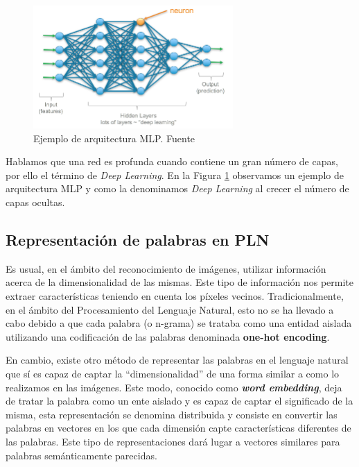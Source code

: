 \begin{figure}[!ht]
	\centering
	\includegraphics[width=0.68\textwidth]{images/arte/mlp}
	\caption{Ejemplo de arquitectura MLP. Fuente \cite{mlp}}
	\label{fig:mlp}
\end{figure}



Hablamos que una red es profunda cuando contiene un gran número de capas, por ello el término de \textit{Deep Learning}. En la Figura \ref{fig:mlp} observamos un ejemplo de arquitectura MLP y como la denominamos \textit{Deep Learning} al crecer el número de capas ocultas.


\subsection{Representación de palabras en PLN}%

Es usual, en el ámbito del reconocimiento de imágenes, utilizar información acerca de la dimensionalidad de las mismas. Este tipo de información nos permite extraer características  teniendo en cuenta los píxeles vecinos. Tradicionalmente, en el ámbito del Procesamiento del Lenguaje Natural, esto no se ha llevado a cabo debido a que cada palabra (o n-grama) se trataba como una entidad aislada utilizando una codificación de las palabras denominada \textbf{one-hot encoding}. 

En cambio, existe otro método de representar las palabras en el lenguaje natural que sí es capaz de captar la ``dimensionalidad'' de una forma similar a como lo realizamos en las imágenes. Este modo, conocido como \textit{\textbf{word embedding}}, deja de tratar la palabra como un ente aislado y  es capaz de captar el significado de la misma, esta representación se denomina distribuida y consiste en convertir las palabras en vectores en los que cada dimensión capte características diferentes de las palabras. Este tipo de representaciones dará lugar a vectores similares para palabras semánticamente parecidas. 


